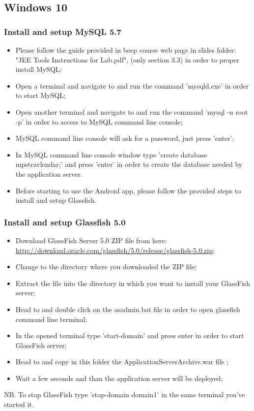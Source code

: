 \subsection{Windows 10}
\label{subsect:Windows 10}

\subsubsection{Install and setup MySQL 5.7}
\begin{itemize}
	\item Please follow the guide provided in beep course web page in slides folder: "JEE Tools Instructions for Lab.pdf", (only section 3.3) in order to proper install MySQL;
	\item Open a terminal and navigate to  and run the command 'mysqld.exe' in order to start MySQL;
	\item Open another terminal and navigate to  and run the command 'mysql -u root -p' in order to access to MySQL command line console;
	\item MySQL command line console will ask for a password, just press 'enter';
	\item In MySQL command line console window type 'create database mps\textunderscore travlendar;' and press 'enter' in order to create the database needed by the application server.
	\item Before starting to use the Android app, please follow the provided steps to install and setup Glassfish.
\end{itemize}

\subsubsection{Install and setup Glassfish 5.0}
\begin{itemize}
	\item Download GlassFish Server 5.0 ZIP file from here: \\ \href{http://download.oracle.com/glassfish/5.0/release/glassfish-5.0.zip}{\color{blue}http://download.oracle.com/glassfish/5.0/release/glassfish-5.0.zip};
	\item Change to the directory where you downloaded the ZIP file;
	\item Extract the file into the directory in which you want to install your GlassFish server;
	\item Head to  and double click on the asadmin.bat file in order to open glassfish command line terminal;
	\item In the opened terminal type 'start-domain' and press enter in order to start GlassFish server;
	\item Head to  and copy in this folder the ApplicationServerArchive.war file ;
	\item Wait a few seconds and than the application server will be deployed;
\end{itemize} 
NB. To stop GlassFish type 'stop-domain domain1' in the same terminal you've started it.
	
